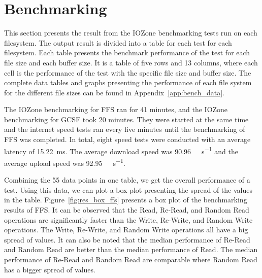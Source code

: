 \section{Benchmarking}
\label{sec:res_bench}
This section presents the result from the IOZone benchmarking tests run on each filesystem. The output result is divided into a table for each test for each filesystem. Each table presents the benchmark performance of the test for each file size and each buffer size. It is a table of five rows and 13 columns, where each cell is the performance of the test with the specific file size and buffer size. The complete data tables and graphs presenting the performance of each file system for the different file sizes can be found in Appendix~\ref{app:bench_data}.

The IOZone benchmarking for FFS ran for 41 minutes, and the IOZone benchmarking for GCSF took 20 minutes. They were started at the same time and the internet speed tests ran every five minutes until the benchmarking of FFS was completed. In total, eight speed tests were conducted with an average latency of \SI{15.22}{\milli\second}. The average download speed was \SI[per-mode = symbol]{90.96}{\mega\bit\per\second} and the average upload speed was \SI[per-mode = symbol]{92.95}{\mega\bit\per\second}.

Combining the 55 data points in one table, we get the overall performance of a test. Using this data, we can plot a box plot presenting the spread of the values in the table. Figure~\ref{fig:res_box_ffs} presents a box plot of the benchmarking results of FFS. It can be observed that the Read, Re-Read, and Random Read operations are significantly faster than the Write, Re-Write, and Random Write operations. The Write, Re-Write, and Random Write operations all have a big spread of values. It can also be noted that the median performance of Re-Read and Random Read are better than the median performance of Read. The median performance of Re-Read and Random Read are comparable where Random Read has a bigger spread of values.

